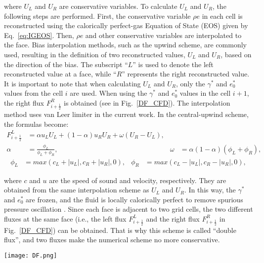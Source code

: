 where $U_L$ and $U_R$ are conservative variables. To calculate $U_L$ and $U_R$, the following steps are performed. First, the conservative variable $\rho e$ in each cell is reconstructed using the calorically perfect-gas Equation of State (EOS) given by Eq.~\ref{eq:IGEOS}. Then, $\rho e$ and other conservative variables are interpolated to the face. Bias interpolation methods, such as the upwind scheme, are commonly used, resulting in the definition of two reconstructed values, $U_L$ and $U_R$, based on the direction of the bias. The subscript ``$L$'' is used to denote the left reconstructed value at a face, while ``$R$'' represents the right reconstructed value. It is important to note that when calculating $U_L$ and $U_R$, only the $\gamma^*$ and $e_0^*$ values from the cell $i$ are used. When using the $\gamma^*$ and $e_0^*$ values in the cell $i+1$, the right flux $F^R_{i+\frac{1}{2}}$ is obtained (see in Fig.~\ref{DF_CFD}). The interpolation method uses van Leer limiter \cite{van1974towards} in the current work. In the central-upwind scheme, the formulas become:
\begin{align} 
    F^L_{i+\frac{1}{2}} &= \alpha u_LU_L + \left(1-\alpha\right)u_R U_R + \omega \left(U_R-U_L\right),\\
    \alpha &= \frac{\phi_L}{\phi_L +\phi_R},&
     \omega &= \alpha \left(1-\alpha\right) \left(\phi_L+\phi_R\right),
\end{align}
\begin{align} 
        \phi_L& = max\left(c_L+|u_L|,c_R + |u_R|,0\right),&\phi_R &= max\left(c_L-|u_L|,c_R - |u_R|,0\right),
\end{align}

where $c$ and $u$ are the speed of sound and velocity, respectively. They are obtained from the same interpolation scheme as $U_L$ and $U_R$.
In this way, the $\gamma^*$ and $e_0^*$ are frozen, and the fluid is locally calorically perfect to remove spurious pressure oscillation \cite{ma2017entropy}. 
Since each face is adjacent to two grid cells, the two different fluxes at the same face (i.e., the left flux $F^L_{i+\frac{1}{2}}$ and the right flux $F^R_{i+\frac{1}{2}}$ in Fig.~\ref{DF_CFD}) can be obtained. That is why this scheme is called ``double flux'', and two fluxes make the numerical scheme no more conservative.  
\begin{figure*}[htbp]
\centering
\texttt{[image: DF.png]}
\caption{Schematic of the double flux (DF) method in a one-dimensional mesh.}
\label{DF_CFD} 
\end{figure*}

